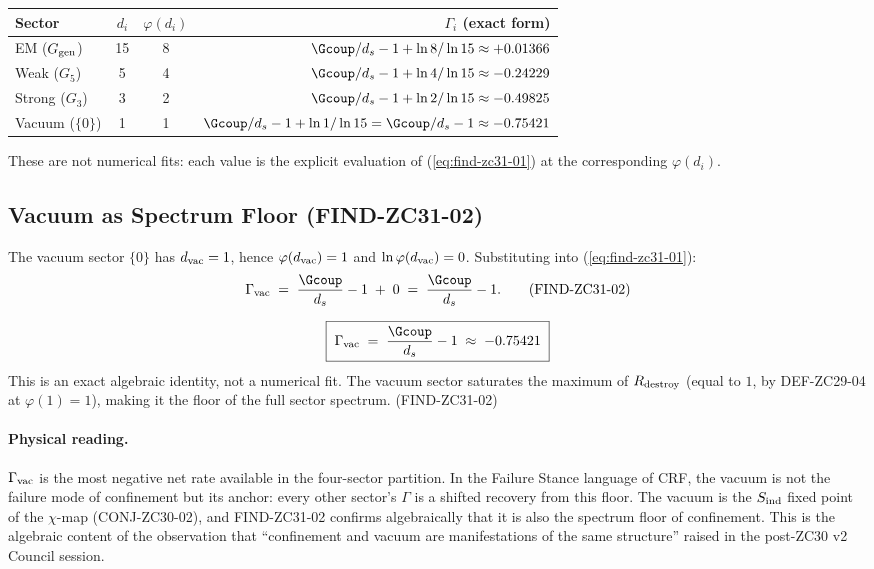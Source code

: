 \documentclass[12pt, a4paper]{article}
\begin{document}
\begin{center}
{\small
\begin{tabular}{lccr}
\toprule
Sector & $d_i$ & $\varphi(d_i)$ & $\Gamma_i$ (exact form) \\
\midrule
EM ($G_{\rm gen}$)
  & 15 & 8 & $\Gcoup/d_s - 1 + \ln 8/\ln 15 \approx +0.01366$\\
Weak ($G_5$)
  & 5  & 4 & $\Gcoup/d_s - 1 + \ln 4/\ln 15 \approx -0.24229$\\
Strong ($G_3$)
  & 3  & 2 & $\Gcoup/d_s - 1 + \ln 2/\ln 15 \approx -0.49825$\\
Vacuum ($\{0\}$)
  & 1  & 1 & $\Gcoup/d_s - 1 + \ln 1/\ln 15 = \Gcoup/d_s - 1 \approx -0.75421$\\
\bottomrule
\end{tabular}
}
\end{center}
\medskip

These are not numerical fits: each value is the explicit
evaluation of (\ref{eq:find-zc31-01}) at the corresponding
$\varphi(d_i)$.

\subsection{Vacuum as Spectrum Floor (FIND-ZC31-02)}
\label{sec:vac-floor}

The vacuum sector $\{0\}$ has $d_{\rm vac} = 1$, hence
$\varphi(d_{\rm vac}) = 1$ and $\ln\varphi(d_{\rm vac}) = 0$.
Substituting into (\ref{eq:find-zc31-01}):
\begin{equation}
  \Gamma_{\rm vac}
    \;=\; \frac{\Gcoup}{d_s} - 1
    \;+\; 0
    \;=\; \frac{\Gcoup}{d_s} - 1.
  \tag{FIND-ZC31-02}\label{eq:find-zc31-02}
\end{equation}

\begin{derivedbox}[title={FIND-ZC31-02: Vacuum spectrum floor
  (exact)}]
\[
  \boxed{\;\Gamma_{\rm vac} \;=\; \frac{\Gcoup}{d_s} - 1
  \;\approx\; -0.75421\;}
\]
This is an exact algebraic identity, not a numerical fit. The
vacuum sector saturates the maximum of $R_{\rm destroy}$
(equal to $1$, by DEF-ZC29-04 at $\varphi(1) = 1$), making it
the floor of the full sector spectrum.
\hfill\textup{(FIND-ZC31-02)}
\end{derivedbox}

\paragraph{Physical reading.}
$\Gamma_{\rm vac}$ is the most negative net rate available in
the four-sector partition. In the Failure Stance language of
CRF, the vacuum is not the failure mode of confinement but its
anchor: every other sector's $\Gamma$ is a shifted recovery
from this floor. The vacuum is the $S_{\rm ind}$ fixed point
of the $\chi$-map (CONJ-ZC30-02), and FIND-ZC31-02 confirms
algebraically that it is also the spectrum floor of confinement.
This is the algebraic content of the observation that
``confinement and vacuum are manifestations of the same
structure'' raised in the post-ZC30 v2 Council session.
\end{document}
